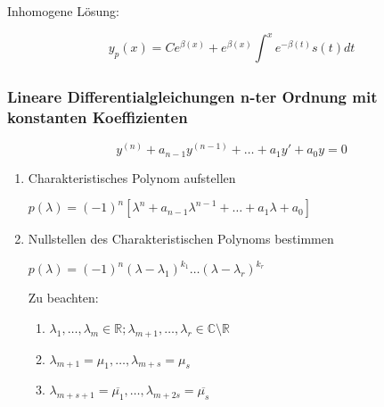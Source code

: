 \documentclass[]{article}
\begin{document}
				Inhomogene Lösung:
				
				\begin{displaymath}
					y_p(x) = Ce^{\beta(x)} + e^{\beta(x)} \int_{}^{x} e^{-\beta(t)} s(t) dt
				\end{displaymath}
				
			\subsubsection{Lineare Differentialgleichungen n-ter Ordnung mit konstanten Koeffizienten}
			
				\begin{displaymath}
					y^{(n)} + a_{n-1} y^{(n-1)} + \dots + a_1 y' + a_0 y = 0
				\end{displaymath}
				
				\begin{enumerate}[1.]
					\item Charakteristisches Polynom aufstellen
					
						\begin{math}
							p(\lambda) = (-1)^n [\lambda^n + a_{n-1} \lambda^{n-1} + \dots + a_1 \lambda + a_0]
						\end{math}
					
					\item Nullstellen des Charakteristischen Polynoms bestimmen
					
						\begin{math}
							p(\lambda) = (-1)^n (\lambda - \lambda_1)^{k_1} \dots (\lambda - \lambda_r)^{k_r}
						\end{math}
						
						Zu beachten:
						
						\begin{enumerate}[]

						\item \begin{math} \lambda_1, \dots, \lambda_m \in \mathbb{R}; \lambda_{m+1}, \dots, \lambda_r \in \mathbb{C} \setminus \mathbb{R} \end{math}
						
						\item \begin{math} \lambda_{m+1} = \mu_1, \dots, \lambda_{m+s} = \mu_s \end{math}
						
						\item \begin{math} \lambda_{m+s+1} = \overline{\mu_1}, \dots, \lambda_{m+2s} = \overline{\mu_s} \end{math}
						

\end{enumerate}
\end{enumerate}
\end{document}
